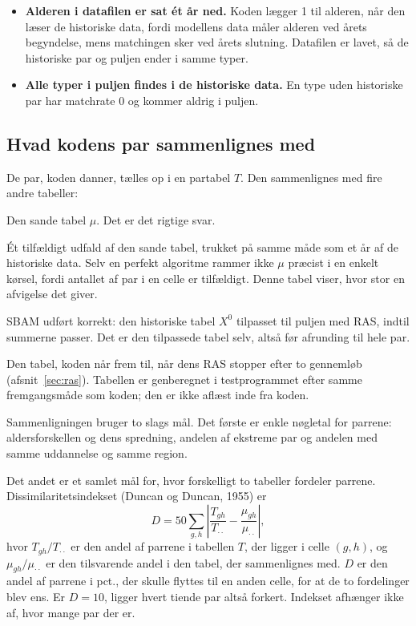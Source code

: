 \documentclass[11pt,a4paper]{article}
\begin{document}
\begin{itemize}
\item \textbf{Alderen i datafilen er sat ét år ned.} Koden lægger 1 til alderen, når den læser de
historiske data, fordi modellens data måler alderen ved årets begyndelse, mens matchingen sker ved
årets slutning. Datafilen er lavet, så de historiske par og puljen ender i samme typer.
\item \textbf{Alle typer i puljen findes i de historiske data.} En type uden historiske par har
matchrate 0 og kommer aldrig i puljen.
\end{itemize}

\subsection{Hvad kodens par sammenlignes med}

De par, koden danner, tælles op i en partabel $T$. Den sammenlignes med fire andre tabeller:

\begin{description}[leftmargin=1.5em, style=nextline]
\item[Sand model] Den sande tabel $\mu$. Det er det rigtige svar.
\item[Sand model, ét træk] Ét tilfældigt udfald af den sande tabel, trukket på samme måde som et år
af de historiske data. Selv en perfekt algoritme rammer ikke $\mu$ præcist i en enkelt kørsel, fordi
antallet af par i en celle er tilfældigt. Denne tabel viser, hvor stor en afvigelse det giver.
\item[Reference-SBAM] SBAM udført korrekt: den historiske tabel $X^0$ tilpasset til puljen med RAS,
indtil summerne passer. Det er den tilpassede tabel selv, altså før afrunding til hele par.
\item[Kodens RAS-tabel] Den tabel, koden når frem til, når dens RAS stopper efter to gennemløb
(afsnit~\ref{sec:ras}). Tabellen er genberegnet i testprogrammet efter samme fremgangsmåde som
koden; den er ikke aflæst inde fra koden.
\end{description}

Sammenligningen bruger to slags mål. Det første er enkle nøgletal for parrene: aldersforskellen og
dens spredning, andelen af ekstreme par og andelen med samme uddannelse og samme region.

Det andet er et samlet mål for, hvor forskelligt to tabeller fordeler parrene.
Dissimilaritetsindekset (Duncan og Duncan, 1955) er
\[
D=50\sum_{g,h}\left|\frac{T_{gh}}{T_{\cdot\cdot}}-\frac{\mu_{gh}}{\mu_{\cdot\cdot}}\right| ,
\]
hvor $T_{gh}/T_{\cdot\cdot}$ er den andel af parrene i tabellen $T$, der ligger i celle $(g,h)$, og
$\mu_{gh}/\mu_{\cdot\cdot}$ er den tilsvarende andel i den tabel, der sammenlignes med. $D$ er den
andel af parrene i pct., der skulle flyttes til en anden celle, for at de to fordelinger blev ens. Er
$D=10$, ligger hvert tiende par altså forkert. Indekset afhænger ikke af, hvor mange par der er.
\end{document}
